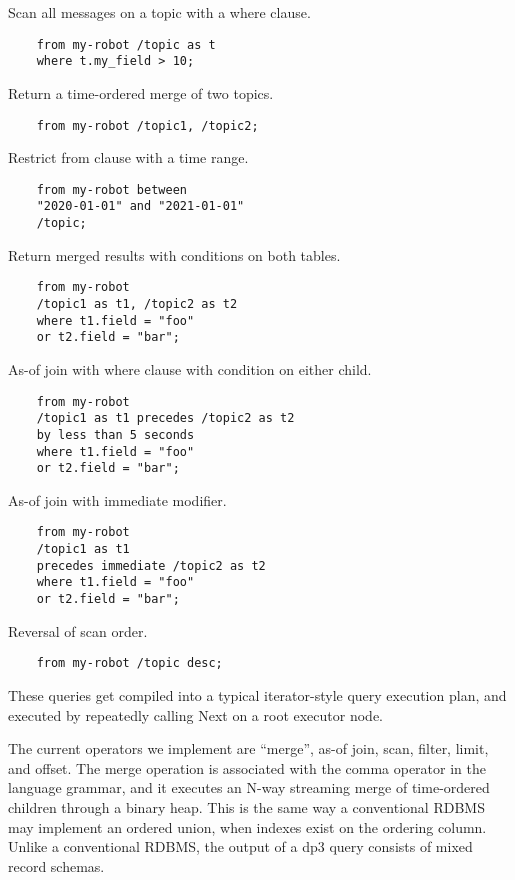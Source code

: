 \documentclass[9pt,twocolumn]{article}
\newcommand{\q}[1]{``#1''}
\begin{document}
    Scan all messages on a topic with a where clause.
    \begin{lstlisting}
    from my-robot /topic as t
    where t.my_field > 10;
    \end{lstlisting}

    Return a time-ordered merge of two topics.
    \begin{lstlisting}
    from my-robot /topic1, /topic2;
    \end{lstlisting}

    Restrict from clause with a time range.
    \begin{lstlisting}
    from my-robot between
    "2020-01-01" and "2021-01-01"
    /topic;
    \end{lstlisting}

    Return merged results with conditions on both tables.
    \begin{lstlisting}
    from my-robot
    /topic1 as t1, /topic2 as t2
    where t1.field = "foo"
    or t2.field = "bar";
    \end{lstlisting}

    As-of join with where clause with condition on either child.
    \begin{lstlisting}
    from my-robot
    /topic1 as t1 precedes /topic2 as t2
    by less than 5 seconds
    where t1.field = "foo"
    or t2.field = "bar";
    \end{lstlisting}

    As-of join with immediate modifier.
    \begin{lstlisting}
    from my-robot
    /topic1 as t1
    precedes immediate /topic2 as t2
    where t1.field = "foo"
    or t2.field = "bar";
    \end{lstlisting}

    Reversal of scan order.
    \begin{lstlisting}
    from my-robot /topic desc;
    \end{lstlisting}

    These queries get compiled into a typical iterator-style query execution plan,
    and executed by repeatedly calling Next on a root executor node.

    The current operators we implement are \q{merge}, as-of join, scan, filter,
    limit, and offset. The merge operation is associated with the comma operator
    in the language grammar, and it executes an N-way streaming merge of
    time-ordered children through a binary heap. This is the same way a
    conventional RDBMS may implement an ordered union, when indexes exist on the
    ordering column. Unlike a conventional RDBMS, the output of a dp3 query
    consists of mixed record schemas.
\end{document}
